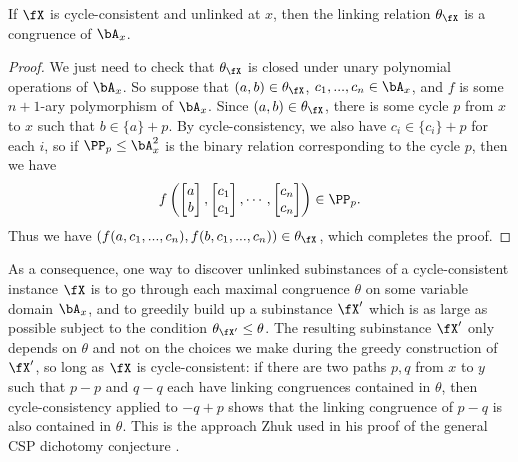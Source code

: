 \begin{prop} If $\fX$ is cycle-consistent and unlinked at $x$, then the linking relation $\theta_\fX$ is a congruence of $\bA_x$.
\end{prop}
\begin{proof} We just need to check that $\theta_\fX$ is closed under unary polynomial operations of $\bA_x$. So suppose that $(a,b) \in \theta_\fX$, $c_1, ..., c_n \in \bA_x$, and $f$ is some $n+1$-ary polymorphism of $\bA_x$. Since $(a,b) \in \theta_\fX$, there is some cycle $p$ from $x$ to $x$ such that $b \in \{a\}+p$. By cycle-consistency, we also have $c_i \in \{c_i\} + p$ for each $i$, so if $\PP_p \le \bA_x^2$ is the binary relation corresponding to the cycle $p$, then we have
\[
f\left(\begin{bmatrix}a\\b\end{bmatrix},\begin{bmatrix}c_1\\c_1\end{bmatrix},\cdots,\begin{bmatrix}c_n\\c_n\end{bmatrix}\right) \in \PP_p.
\]
Thus we have $(f(a, c_1, ..., c_n), f(b, c_1, ..., c_n)) \in \theta_\fX$, which completes the proof.
\end{proof}

As a consequence, one way to discover unlinked subinstances of a cycle-consistent instance $\fX$ is to go through each maximal congruence $\theta$ on some variable domain $\bA_x$, and to greedily build up a subinstance $\fX'$ which is as large as possible subject to the condition $\theta_{\fX'} \le \theta$. The resulting subinstance $\fX'$ only depends on $\theta$ and not on the choices we make during the greedy construction of $\fX'$, so long as $\fX$ is cycle-consistent: if there are two paths $p,q$ from $x$ to $y$ such that $p-p$ and $q-q$ each have linking congruences contained in $\theta$, then cycle-consistency applied to $-q+p$ shows that the linking congruence of $p-q$ is also contained in $\theta$. This is the approach Zhuk used in his proof of the general CSP dichotomy conjecture \cite{zhuk-dichotomy}.

